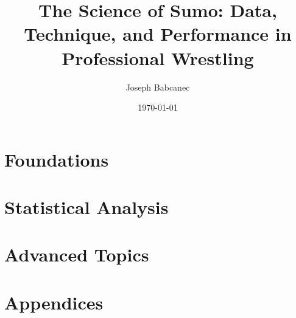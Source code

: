 \documentclass[10pt,twoside,openright]{book}
\title{The Science of Sumo: Data, Technique, and Performance in Professional Wrestling}
\author{Joseph Babcanec}
\date{\today}
\begin{document}
\frontmatter
\maketitle

\tableofcontents
\listoffigures
\listoftables



\mainmatter

\part{Foundations}






\part{Statistical Analysis}



\part{Advanced Topics}





\backmatter

\part{Appendices}
\appendix





\printbibliography[heading=bibintoc,title={References}]

\printindex
\end{document}
